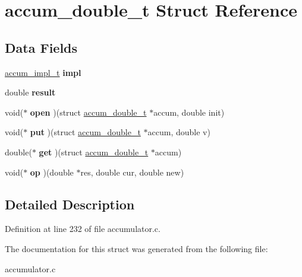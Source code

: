 \hypertarget{structaccum__double__t}{\section{accum\-\_\-double\-\_\-t Struct Reference}
\label{structaccum__double__t}
}
\subsection*{Data Fields}
\begin{DoxyCompactItemize}
\item 
\hypertarget{structaccum__double__t_ae08b7821ce165aa6d03edb271dcf6ced}{\hyperlink{structaccum__impl__t}{accum\-\_\-impl\-\_\-t} {\bfseries impl}}\label{structaccum__double__t_ae08b7821ce165aa6d03edb271dcf6ced}

\item 
\hypertarget{structaccum__double__t_abccdea1c1c777c62cbd6752d21d65315}{double {\bfseries result}}\label{structaccum__double__t_abccdea1c1c777c62cbd6752d21d65315}

\item 
\hypertarget{structaccum__double__t_a0096c99cf6cfced2bf40b549a9f96fd0}{void($\ast$ {\bfseries open} )(struct \hyperlink{structaccum__double__t}{accum\-\_\-double\-\_\-t} $\ast$accum, double init)}\label{structaccum__double__t_a0096c99cf6cfced2bf40b549a9f96fd0}

\item 
\hypertarget{structaccum__double__t_abb609ebbe153d505494e09b16cd0d286}{void($\ast$ {\bfseries put} )(struct \hyperlink{structaccum__double__t}{accum\-\_\-double\-\_\-t} $\ast$accum, double v)}\label{structaccum__double__t_abb609ebbe153d505494e09b16cd0d286}

\item 
\hypertarget{structaccum__double__t_a84fbebc9ba18acc25a2c3c2624551084}{double($\ast$ {\bfseries get} )(struct \hyperlink{structaccum__double__t}{accum\-\_\-double\-\_\-t} $\ast$accum)}\label{structaccum__double__t_a84fbebc9ba18acc25a2c3c2624551084}

\item 
\hypertarget{structaccum__double__t_a99d6d646cad6c53f67b91614a1c8d4a2}{void($\ast$ {\bfseries op} )(double $\ast$res, double cur, double new)}\label{structaccum__double__t_a99d6d646cad6c53f67b91614a1c8d4a2}

\end{DoxyCompactItemize}


\subsection{Detailed Description}


Definition at line 232 of file accumulator.\-c.



The documentation for this struct was generated from the following file\-:\begin{DoxyCompactItemize}
\item 
accumulator.\-c\end{DoxyCompactItemize}
